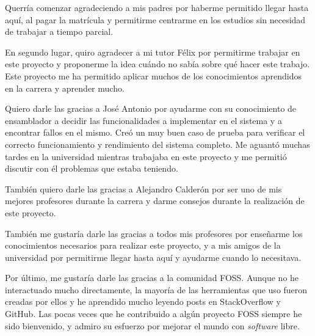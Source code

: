 \documentclass[es]{uc3mthesisIEEE}
\begin{document}
  \begin{acknowledgements}
    Querría comenzar agradeciendo a mis padres por haberme permitido llegar
    hasta aquí, al pagar la matrícula y permitirme centrarme en los estudios sin
    necesidad de trabajar a tiempo parcial.

    En segundo lugar, quiro agradecer a mi tutor Félix por permitirme trabajar
    en este proyecto y proponerme la idea cuándo no sabía sobre qué hacer este
    trabajo. Este proyecto me ha permitido aplicar muchos de los conocimientos
    aprendidos en la carrera y aprender mucho.

    Quiero darle las gracias a José Antonio por ayudarme con su conocimiento de
    ensamblador a decidir las funcionalidades a implementar en el sistema y a
    encontrar fallos en el mismo. Creó un muy buen caso de prueba para verificar
    el correcto funcionamiento y rendimiento del sistema completo. Me aguantó
    muchas tardes en la universidad mientras trabajaba en este proyecto y me
    permitió discutir con él problemas que estaba teniendo.

    También quiero darle las gracias a Alejandro Calderón por ser uno de mis
    mejores profesores durante la carrera y darme consejos durante la
    realización de este proyecto.

    También me gustaría darle las gracias a todos mis profesores por enseñarme
    los conocimientos necesarios para realizar este proyecto, y a mis amigos de
    la universidad por permitirme llegar hasta aquí y ayudarme cuando lo
    necesitava.

    Por último, me gustaría darle las gracias a la comunidad FOSS. Aunque no he
    interactuado mucho directamente, la mayoría de las herramientas que uso
    fueron creadas por ellos y he aprendido mucho leyendo posts en StackOverflow
    y GitHub. Las pocas veces que he contribuido a algún proyecto FOSS siempre
    he sido bienvenido, y admiro su esfuerzo por mejorar el mundo con
    \textit{software} libre.
  \end{acknowledgements}


  \tableofcontents
  \listoffigures
  \listoftables


  \begin{thesis}
  \end{thesis}
\end{document}

